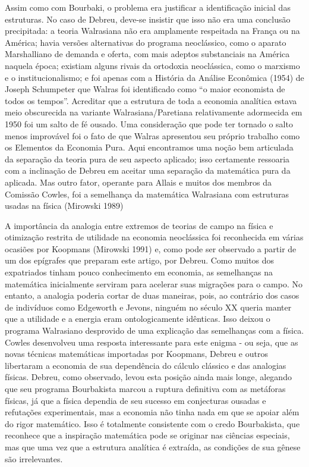 \documentclass[a4paper,12pt]{article}[abntex2]
\begin{document}
Assim como com Bourbaki, o problema era justificar a identificação inicial das estruturas. No caso de Debreu, deve-se insistir que isso não era uma conclusão precipitada: a teoria Walrasiana não era amplamente respeitada na França ou na América; havia versões alternativas do programa neoclássico, como o aparato Marshalliano de demanda e oferta, com mais adeptos substanciais na América naquela época; existiam alguns rivais da ortodoxia neoclássica, como o marxismo e o institucionalismo; e foi apenas com a História da Análise Econômica (1954) de Joseph Schumpeter que Walras foi identificado como “o maior economista de todos os tempos”. Acreditar que a estrutura de toda a economia analítica estava meio obscurecida na variante Walrasiana/Paretiana relativamente adormecida em 1950 foi um salto de fé ousado. Uma consideração que pode ter tornado o salto menos improvável foi o fato de que Walras apresentou seu próprio trabalho como os Elementos da Economia Pura. Aqui encontramos uma noção bem articulada da separação da teoria pura de seu aspecto aplicado; isso certamente ressoaria com a inclinação de Debreu em aceitar uma separação da matemática pura da aplicada. Mas outro fator, operante para Allais e muitos dos membros da Comissão Cowles, foi a semelhança da matemática Walrasiana com estruturas usadas na física (Mirowski 1989)

A importância da analogia entre extremos de teorias de campo na física e otimização restrita de utilidade na economia neoclássica foi reconhecida em várias ocasiões por Koopmans (Mirowski 1991) e, como pode ser observado a partir de um dos epígrafes que preparam este artigo, por Debreu. Como muitos dos expatriados tinham pouco conhecimento em economia, as semelhanças na matemática inicialmente serviram para acelerar suas migrações para o campo. No entanto, a analogia poderia cortar de duas maneiras, pois, ao contrário dos casos de indivíduos como Edgeworth e Jevons, ninguém no século XX queria manter que a utilidade e a energia eram ontologicamente idênticas. Isso deixou o programa Walrasiano desprovido de uma explicação das semelhanças com a física. Cowles desenvolveu uma resposta interessante para este enigma - ou seja, que as novas técnicas matemáticas importadas por Koopmans, Debreu e outros libertaram a economia de sua dependência do cálculo clássico e das analogias físicas. Debreu, como observado, levou esta posição ainda mais longe, alegando que seu programa Bourbakista marcou a ruptura definitiva com as metáforas físicas, já que a física dependia de seu sucesso em conjecturas ousadas e refutações experimentais, mas a economia não tinha nada em que se apoiar além do rigor matemático. Isso é totalmente consistente com o credo Bourbakista, que reconhece que a inspiração matemática pode se originar nas ciências especiais, mas que uma vez que a estrutura analítica é extraída, as condições de sua gênese são irrelevantes.
\end{document}
